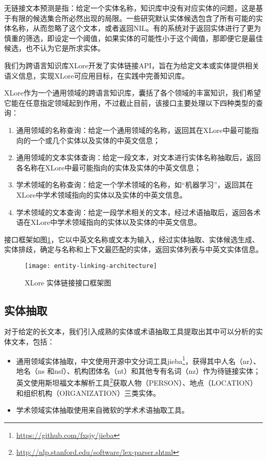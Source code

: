 {\heiti 无链接文本预测}是指：给定一个实体名称，知识库中没有对应实体的问题，这是基于有限的候选集合所必然出现的局限。一些研究默认实体候选包含了所有可能的实体名称，从而忽略了这个文本\cite{kulkarni2009collective,shen2012liege}，或者返回NIL\cite{varma2009iiit}。有的系统对于返回实体进行了更为慎重的筛选，即设定一个阈值，如果实体的可能性小于这个阈值，那即便它是最佳候选，也不认为它是所求实体\cite{han2009nlpr_kbp,lehmann2010lcc,han2011generative}。

我们为跨语言知识库XLore开发了实体链接API，旨在为给定文本或实体提供相关语义信息，实现XLore可应用目标，在实践中完善知识库。


XLore作为一个通用领域的跨语言知识库，囊括了各个领域的丰富知识，我们希望它能在任意指定领域起到作用，不过截止目前，该接口主要处理以下四种类型的查询：
\begin{enumerate}[1.]
\item 通用领域的名称查询：给定一个通用领域的名称，返回其在XLore中最可能指向的一个或几个实体以及实体的中英文信息；
\item 通用领域的文本实体查询：给定一段文本，对文本进行实体名称抽取后，返回各名称在XLore中最可能指向的实体及实体的中英文信息；
\item 学术领域的名称查询：给定一个学术领域的名称，如“机器学习”，返回其在XLore中学术领域指向的实体以及实体的中英文信息。
\item 学术领域的文本查询：给定一段学术相关的文本，经过术语抽取后，返回各术语在XLore中学术领域指向的实体以及实体的中英文信息。
\end{enumerate}

接口框架如图\ref{fig:entity-linking-architecture}，它以中英文名称或文本为输入，经过实体抽取、实体候选生成、实体排歧，确定与名称和上下文最匹配的实体，返回实体列表与中英文实体信息。
\begin{figure}[ht]
  \centering
  \texttt{[image: entity-linking-architecture]}
  \caption{XLore 实体链接接口框架图}
  \label{fig:entity-linking-architecture}
\end{figure}

\subsection{实体抽取}
对于给定的长文本，我们引入成熟的实体或术语抽取工具提取出其中可以分析的实体文本，包括：
\begin{itemize}
\item 通用领域实体抽取，中文使用开源中文分词工具jieba\footnote{\url{https://github.com/fxsjy/jieba}}，获得其中人名（nr）、地名（ns 和nsf）、机构团体名（nt）和其他专有名词（nz）作为待链接实体；英文使用斯坦福文本解析工具\footnote{\url{http://nlp.stanford.edu/software/lex-parser.shtml}}获取人物（PERSON）、地点（LOCATION）和组织机构（ORGANIZATION）三类实体。
\item 学术领域实体抽取使用来自微软的学术术语抽取工具。
\end{itemize}

